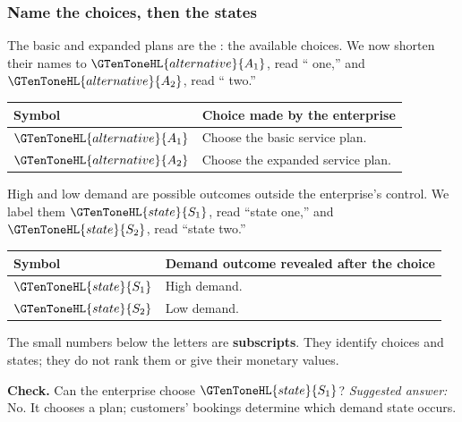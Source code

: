 \subsubsection*{Name the choices, then the states}
The basic and expanded plans are the \textbf{}: the available
choices. We now shorten their names to \(\GTenToneHL{alternative}{A_1}\), read `` one,''
and \(\GTenToneHL{alternative}{A_2}\), read `` two.''
\begin{center}
\begin{tabular}{@{}ll@{}}
\toprule Symbol & Choice made by the enterprise \\ \midrule
\(\GTenToneHL{alternative}{A_1}\) & Choose the basic service plan. \\
\(\GTenToneHL{alternative}{A_2}\) & Choose the expanded service plan. \\
\bottomrule
\end{tabular}
\end{center}
High and low demand are possible outcomes outside the enterprise's control.
We label them \(\GTenToneHL{state}{S_1}\), read ``state one,'' and \(\GTenToneHL{state}{S_2}\), read ``state two.''
\begin{center}
\begin{tabular}{@{}ll@{}}
\toprule Symbol & Demand outcome revealed after the choice \\ \midrule
\(\GTenToneHL{state}{S_1}\) & High demand. \\
\(\GTenToneHL{state}{S_2}\) & Low demand. \\
\bottomrule
\end{tabular}
\end{center}
The small numbers below the letters are \textbf{subscripts}. They identify
choices and states; they do not rank them or give their monetary values.

\textbf{Check.} Can the enterprise choose \(\GTenToneHL{state}{S_1}\)?
\textit{Suggested answer:} No. It chooses a plan; customers' bookings determine
which demand state occurs.

\clearpage
